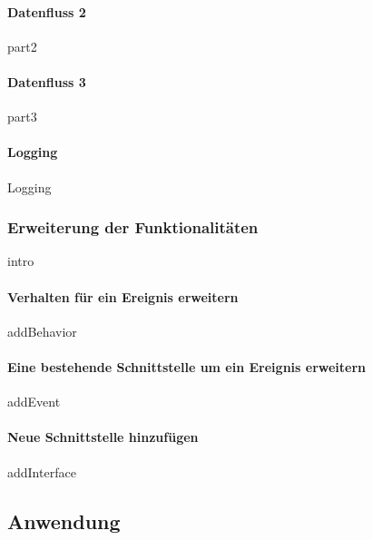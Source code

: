 \documentclass{article}
\begin{document}
            \paragraph{Datenfluss \textbf{2}}
            {part2}
            \newpage
            \paragraph{Datenfluss \textbf{3}}
            {part3} 

   \newpage
            \paragraph{Logging}
                {Logging}


        \newpage
        \subsubsection{Erweiterung der Funktionalitäten}
            {intro}
    
            \paragraph{Verhalten für ein Ereignis erweitern}
            \label{Verhalten für ein Ereignis erweitern}
                {addBehavior}
    
            \paragraph{Eine bestehende Schnittstelle um ein Ereignis erweitern}
                {addEvent}
            \newpage
            \paragraph{Neue Schnittstelle hinzufügen}
                {addInterface}


    \newpage
    \subsection{Anwendung}
\end{document}
